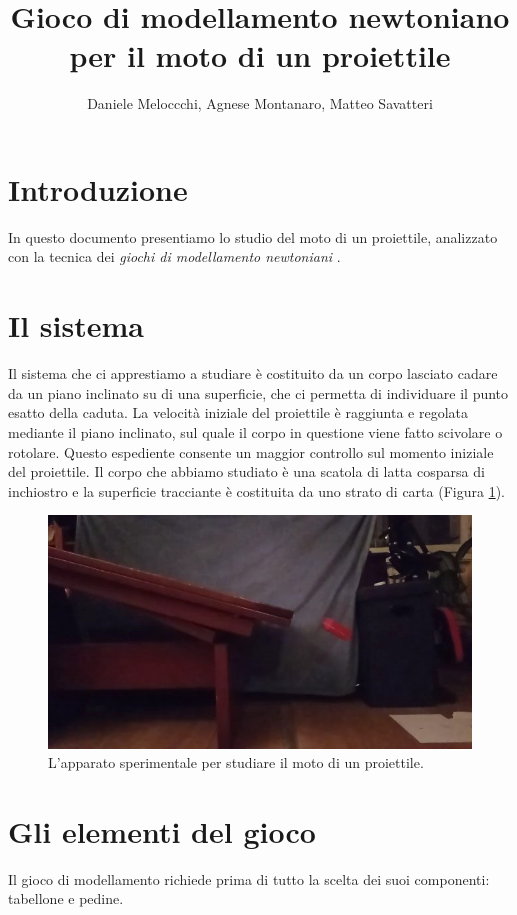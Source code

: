 \documentclass{article}
\title{Gioco di modellamento newtoniano per il moto di un proiettile}
\author{Daniele Meloccchi, Agnese Montanaro, Matteo Savatteri}
\begin{document}
\maketitle

\tableofcontents

\section{Introduzione}
In questo documento presentiamo lo studio del moto di un
proiettile, analizzato con la tecnica dei \emph{giochi di modellamento newtoniani}
\cite{hestenes1992modeling}.

\section{Il sistema}
Il sistema che ci apprestiamo a studiare è costituito da un corpo lasciato cadare da
un piano inclinato su di una superficie, che ci permetta di individuare il 
punto esatto della caduta.  La velocità iniziale del proiettile è raggiunta e
regolata mediante il piano inclinato, sul quale il corpo in questione viene fatto scivolare
o rotolare. Questo espediente consente un maggior controllo sul momento iniziale del
proiettile. Il corpo che abbiamo studiato è una scatola di latta cosparsa di inchiostro
e la superficie tracciante è costituita da uno strato di carta (Figura \ref{fig:setup_proiettile_3}).

\begin{figure}
\centering
  \includegraphics[width=\textwidth]{setup_proiettile_piano_inclinato_3}
  \caption{L'apparato sperimentale per studiare il moto di un proiettile.}
  \label{fig:setup_proiettile_3}
\end{figure}

\section{Gli elementi del gioco}
Il gioco di modellamento richiede prima di tutto la scelta
dei suoi componenti: tabellone e pedine.
\end{document}
